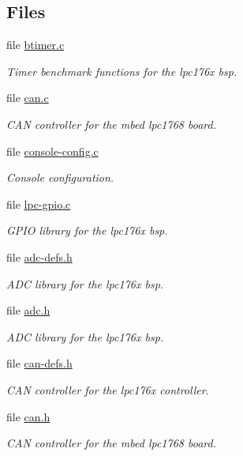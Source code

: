 \subsection*{Files}
\begin{DoxyCompactItemize}
\item 
file \mbox{\hyperlink{arm_2lpc176x_2btimer_2btimer_8c}{btimer.\+c}}
\begin{DoxyCompactList}\small\item\em Timer benchmark functions for the lpc176x bsp. \end{DoxyCompactList}\item 
file \mbox{\hyperlink{can_8c}{can.\+c}}
\begin{DoxyCompactList}\small\item\em C\+AN controller for the mbed lpc1768 board. \end{DoxyCompactList}\item 
file \mbox{\hyperlink{arm_2lpc176x_2console_2console-config_8c}{console-\/config.\+c}}
\begin{DoxyCompactList}\small\item\em Console configuration. \end{DoxyCompactList}\item 
file \mbox{\hyperlink{lpc-gpio_8c}{lpc-\/gpio.\+c}}
\begin{DoxyCompactList}\small\item\em G\+P\+IO library for the lpc176x bsp. \end{DoxyCompactList}\item 
file \mbox{\hyperlink{adc-defs_8h}{adc-\/defs.\+h}}
\begin{DoxyCompactList}\small\item\em A\+DC library for the lpc176x bsp. \end{DoxyCompactList}\item 
file \mbox{\hyperlink{lpc176x_2include_2bsp_2adc_8h}{adc.\+h}}
\begin{DoxyCompactList}\small\item\em A\+DC library for the lpc176x bsp. \end{DoxyCompactList}\item 
file \mbox{\hyperlink{can-defs_8h}{can-\/defs.\+h}}
\begin{DoxyCompactList}\small\item\em C\+AN controller for the lpc176x controller. \end{DoxyCompactList}\item 
file \mbox{\hyperlink{can_8h}{can.\+h}}
\begin{DoxyCompactList}\small\item\em C\+AN controller for the mbed lpc1768 board. \end{DoxyCompactList}\item 

\end{DoxyCompactItemize}
